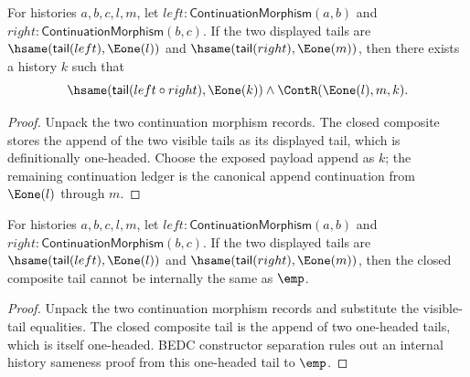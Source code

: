 \begin{theorem}
\label{thm:continuation-morphism-comp-visible-tails-result-cases}
For histories $a,b,c,l,m$, let
$left:\mathsf{ContinuationMorphism}(a,b)$ and
$right:\mathsf{ContinuationMorphism}(b,c)$. If the two displayed tails are
$\hsame(\mathsf{tail}(left),\Eone(l))$ and
$\hsame(\mathsf{tail}(right),\Eone(m))$, then there exists a history $k$ such
that
$$
\hsame(\mathsf{tail}(left\circ right),\Eone(k))\land
\ContR(\Eone(l),m,k).
$$
\end{theorem}
\begin{proof}
Unpack the two continuation morphism records. The closed composite stores the
append of the two visible tails as its displayed tail, which is definitionally
one-headed. Choose the exposed payload append as $k$; the remaining continuation
ledger is the canonical append continuation from $\Eone(l)$ through $m$.
\end{proof}

\begin{theorem}
\label{thm:continuation-morphism-visible-tail-composite-not-empty}
For histories $a,b,c,l,m$, let
$left:\mathsf{ContinuationMorphism}(a,b)$ and
$right:\mathsf{ContinuationMorphism}(b,c)$. If the two displayed tails are
$\hsame(\mathsf{tail}(left),\Eone(l))$ and
$\hsame(\mathsf{tail}(right),\Eone(m))$, then the closed composite tail cannot
be internally the same as $\emp$.
\end{theorem}
\begin{proof}
Unpack the two continuation morphism records and substitute the visible-tail
equalities. The closed composite tail is the append of two one-headed tails,
which is itself one-headed. BEDC constructor separation rules out an internal
history sameness proof from this one-headed tail to $\emp$.
\end{proof}

